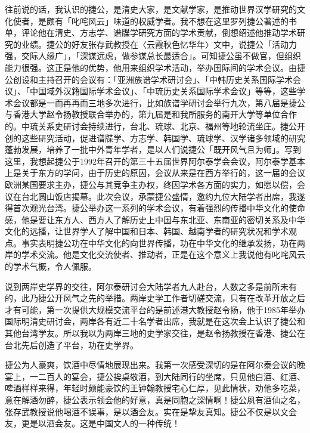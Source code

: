 往前说的话，我认识的捷公，是清史大家，是文献学家，是推动世界汉学研究的文化使者，是颇有「叱咤风云」味道的权威学者。我不想在这里罗列捷公著述的书单，评论他在清史、方志学、谱牒学研究方面的学术贡献，倒想绍述他推动学术研究的业绩。捷公的好友张存武教授在〈云霞秋色忆华年〉文中，说捷公「活动力强，交际人缘广」，「深谋远虑，做参谋总长最适合」。可知捷公虽不做官，但组织能力很强。这正是他的优势，他用来组织学术活动，举办国际间的学术会议。由捷公创设和主持召开的会议有：「亚洲族谱学术研讨会」、「中韩历史关系国际学术会议」、「中国域外汉籍国际学术会议」、「中琉历史关系国际学术会议」等等，这些学术会议都是一而再再而三地多次进行，比如族谱学研讨会举行九次，第八届是捷公与香港大学赵令扬教授联合举办的，第九届是和我所服务的南开大学等单位合作的。中琉关系史研讨会持续进行，台北、琉球、北京、福州等地轮流坐庄。捷公开创的这些研究活动，促进谱牒学、方志学、韩国学、琉球学、汉学诸多领域的研究蓬勃发展，培养了一批中外青年学者，是以人们说捷公「既开风气且为师」。写到这里，我想起捷公于1992年召开的第三十五届世界阿尔泰学会会议，阿尔泰学基本上是关于东方的学问，由于历史的原因，会议从来是在西方举行的，这一届的会议欧洲某国要求主办，捷公与其竞争主办权，终因学术各方面的实力，如愿以偿，会议在台北圆山饭店揭幕。此次会议，承蒙捷公盛情，邀约九位大陆学者出席，我遂得首次观光台湾。捷公举办这一系列的学术会议，有着强烈的传播中华文化的使命感，他是要让东方人、西方人了解历史上中国与东北亚、东南亚的密切关系及中华文化的远播，让世界学人了解中国和日本、韩国、越南学者的研究状况和学术观点。事实表明捷公功在中华文化的向世界传播，功在中华文化的继承发扬，功在两岸的学术交流。他是文化交流使者、推动者，正是在这个意义上我说他有叱咤风云的学术气概，令人佩服。

说到两岸史学界的交往，阿尔泰研讨会大陆学者九人赴台，人数之多是前所未有的，此乃捷公开风气之先的举措。两岸史学工作者切磋交流，只有在改革开放之后才有可能，第一次提供大规模交流平台的是前述港大教授赵令扬，他于1985年举办国际明清史研讨会，两岸各有近二十名学者出席，我就是在这次会上认识了捷公和其他台湾学友。所以我以为两岸三地的史学家交往，是赵令扬教授在香港、捷公在台北先后创造了平台，功在史学界。


捷公为人豪爽，饮酒中尽情地展现出来。我第一次感受深切的是在阿尔泰会议的晚宴上，一二百人的宴会，捷公挨桌敬酒，到大陆同行的坐席，只见他白酒、红酒、啤酒样样来得，年轻时颇能豪饮的王钟翰教授宅心仁厚，见此情状，劝他多吃菜，意在解酒勿醉，捷公表示领会他的好意，真是同胞之深情啊！捷公夙有酒仙之名，张存武教授说他喝酒不误事，是以酒会友。实在是挚友真知。捷公不仅是以文会友，更是以酒会友。这是中国文人的一种传统！

